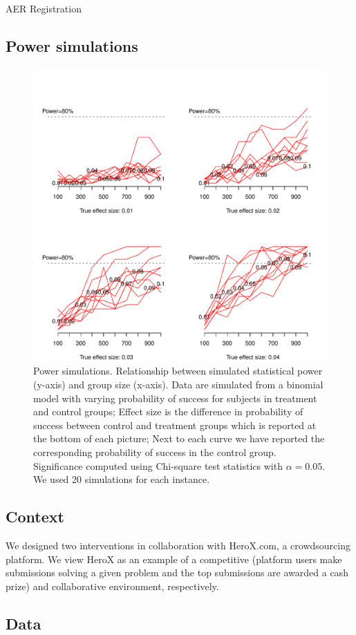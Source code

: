 \documentclass[12pt, titlepage]{article}
\begin{document}
AER Registration

\subsection{Power simulations}\label{power-simulations}

\begin{figure}
\centering
\includegraphics{Figures/unnamed-chunk-6-1.pdf}
\caption{Power simulations. Relationship between simulated statistical
power (y-axis) and group size (x-axis). Data are simulated from a
binomial model with varying probability of success for subjects in
treatment and control groups; Effect size is the difference in
probability of success between control and treatment groups which is
reported at the bottom of each picture; Next to each curve we have
reported the corresponding probability of success in the control group.
Significance computed using Chi-square test statistics with
\(\alpha=0.05\). We used 20 simulations for each instance.}
\end{figure}

\subsection{Context}\label{context}

We designed two interventions in collaboration with HeroX.com, a
crowdsourcing platform. We view HeroX as an example of a competitive
(platform users make submissions solving a given problem and the top
submissions are awarded a cash prize) and collaborative environment,
respectively.

\subsection{Data}\label{data}

\renewcommand\refname{References}

\end{document}
